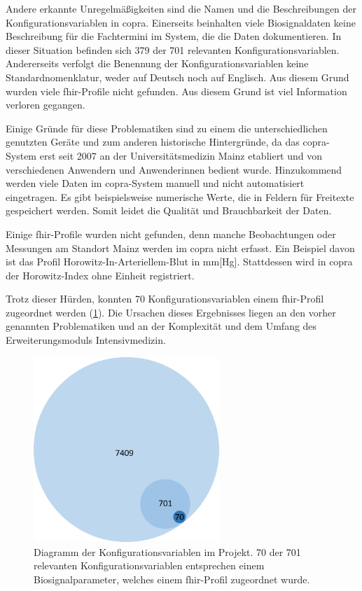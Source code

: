 Andere erkannte Unregelmäßigkeiten sind die Namen und die Beschreibungen der Konfigurationsvariablen in \ac{copra}. Einerseits beinhalten viele Biosignaldaten keine Beschreibung für die Fachtermini im System, die die Daten dokumentieren. In dieser Situation befinden sich 379 der 701 relevanten Konfigurationsvariablen. Andererseits verfolgt die Benennung der Konfigurationsvariablen keine Standardnomenklatur, weder auf Deutsch noch auf Englisch. Aus diesem Grund wurden viele \ac{fhir}-Profile nicht gefunden. Aus diesem Grund ist viel Information verloren gegangen.

Einige Gründe für diese Problematiken sind zu einem die unterschiedlichen genutzten Geräte und zum anderen historische Hintergründe, da das \ac{copra}-System erst seit 2007 an der Universitätsmedizin Mainz etabliert und von verschiedenen Anwendern und Anwenderinnen bedient wurde. Hinzukommend werden viele Daten im \ac{copra}-System manuell und nicht automatisiert eingetragen. Es gibt beispielsweise numerische Werte, die in Feldern für Freitexte gespeichert werden. Somit leidet die Qualität und Brauchbarkeit der Daten.

Einige \ac{fhir}-Profile wurden nicht gefunden, denn manche Beobachtungen oder Messungen am Standort Mainz werden im \ac{copra} nicht erfasst. Ein Beispiel davon ist das Profil \glqq Horowitz-In-Arteriellem-Blut\grqq{} in mm[Hg]. Stattdessen wird in \ac{copra} der Horowitz-Index ohne Einheit registriert.

Trotz dieser Hürden, konnten 70 Konfigurationsvariablen einem \ac{fhir}-Profil zugeordnet werden (\ref{fig:conf_var}). Die Ursachen dieses Ergebnisses liegen an den vorher genannten Problematiken und an der Komplexität und dem Umfang des Erweiterungsmoduls \glqq Intensivmedizin\grqq{}.

\begin{figure}[ht]
	\centering
	\includegraphics[height=7cm]{figures/config_var}
	\caption[Diagramm der Konfigurationsvariablen im Projekt]{Diagramm der Konfigurationsvariablen im Projekt. 70 der 701 relevanten Konfigurationsvariablen entsprechen einem Biosignalparameter, welches einem \ac{fhir}-Profil zugeordnet wurde. 
	}
	\label{fig:conf_var}
\end{figure}